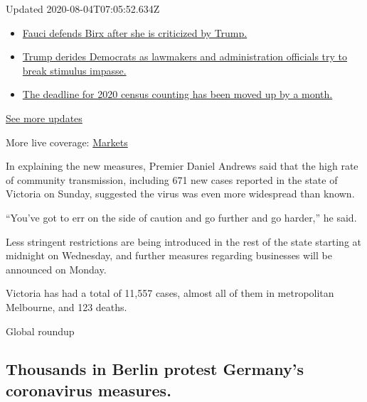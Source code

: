 Updated 2020-08-04T07:05:52.634Z

\begin{itemize}
\tightlist
\item
  \href{https://www.nytimes3xbfgragh.onion/2020/08/03/world/coronavirus-covid-19.html?action=click\&pgtype=Article\&state=default\&region=MAIN_CONTENT_1\&context=storylines_live_updates\#link-4547638f}{Fauci
  defends Birx after she is criticized by Trump.}
\item
  \href{https://www.nytimes3xbfgragh.onion/2020/08/03/world/coronavirus-covid-19.html?action=click\&pgtype=Article\&state=default\&region=MAIN_CONTENT_1\&context=storylines_live_updates\#link-15e7f995}{Trump
  derides Democrats as lawmakers and administration officials try to
  break stimulus impasse.}
\item
  \href{https://www.nytimes3xbfgragh.onion/2020/08/03/world/coronavirus-covid-19.html?action=click\&pgtype=Article\&state=default\&region=MAIN_CONTENT_1\&context=storylines_live_updates\#link-e5a2cda}{The
  deadline for 2020 census counting has been moved up by a month.}
\end{itemize}

\href{https://www.nytimes3xbfgragh.onion/2020/08/03/world/coronavirus-covid-19.html?action=click\&pgtype=Article\&state=default\&region=MAIN_CONTENT_1\&context=storylines_live_updates}{See
more updates}

More live coverage:
\href{https://www.nytimes3xbfgragh.onion/live/2020/08/03/business/stock-market-today-coronavirus?action=click\&pgtype=Article\&state=default\&region=MAIN_CONTENT_1\&context=storylines_live_updates}{Markets}

In explaining the new measures, Premier Daniel Andrews said that the
high rate of community transmission, including 671 new cases reported in
the state of Victoria on Sunday, suggested the virus was even more
widespread than known.

``You've got to err on the side of caution and go further and go
harder,'' he said.

Less stringent restrictions are being introduced in the rest of the
state starting at midnight on Wednesday, and further measures regarding
businesses will be announced on Monday.

Victoria has had a total of 11,557 cases, almost all of them in
metropolitan Melbourne, and 123 deaths.

Global roundup

\hypertarget{thousands-in-berlin-protest-germanys-coronavirus-measures}{%
\subsection{Thousands in Berlin protest Germany's coronavirus
measures.}\label{thousands-in-berlin-protest-germanys-coronavirus-measures}}

